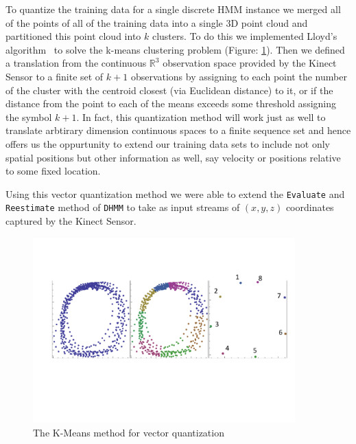To quantize the training data for a single discrete HMM instance we merged all of the points of all of the training data into a single 3D point cloud and partitioned this point cloud into $k$ clusters. To do this we implemented Lloyd's algorithm~\citep{lloyd1982least} to solve the k-means clustering problem (Figure: \ref{fig:kmeans}). Then we defined a translation from the continuous $\mathbb{R}^3$ observation space provided by the Kinect Sensor to a finite set of $k+1$ observations by assigning to each point the number of the cluster with the centroid closest (via Euclidean distance) to it, or if the distance from the point to each of the means exceeds some threshold assigning the symbol $k+1$. In fact, this quantization method will work just as well to translate arbtirary dimension continuous spaces to a finite sequence set and hence offers us the oppurtunity to extend our training data sets to include not only spatial positions but other information as well, say velocity or positions relative to some fixed location.

Using this vector quantization method we were able to extend the \verb|Evaluate| and \verb|Reestimate| method of \verb|DHMM| to take as input streams of $(x,y,z)$ coordinates captured by the Kinect Sensor.

\begin{figure}[h!]
        \centering
        \includegraphics[width=0.9\textwidth]{ThesisFigs/ClusteringDiag}
        \caption{The K-Means method for vector quantization}\label{fig:kmeans}
\end{figure}

